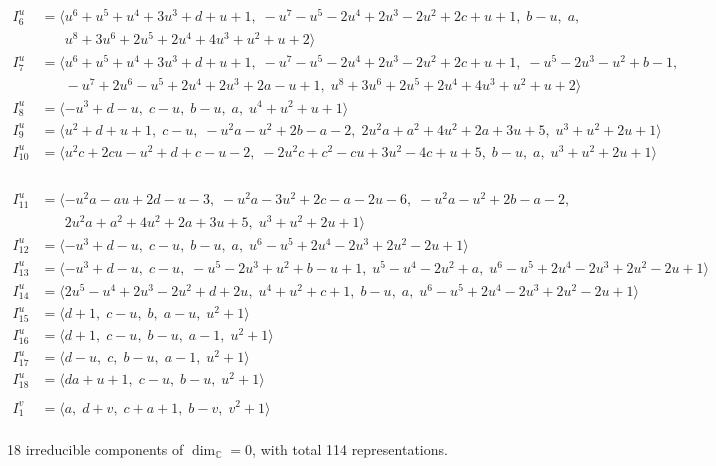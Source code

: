 \documentclass[1p]{elsarticle_modified}
\theoremstyle{definition}
\begin{document}
\begin{align*}
I^u_{6}&=\langle 
u^6+u^5+u^4+3 u^3+d+u+1,\;- u^7- u^5-2 u^4+2 u^3-2 u^2+2 c+u+1,\;b- u,\;a,\\
\phantom{I^u_{6}}&\phantom{= \langle  }u^8+3 u^6+2 u^5+2 u^4+4 u^3+u^2+u+2\rangle \\
I^u_{7}&=\langle 
u^6+u^5+u^4+3 u^3+d+u+1,\;- u^7- u^5-2 u^4+2 u^3-2 u^2+2 c+u+1,\;- u^5-2 u^3- u^2+b-1,\\
\phantom{I^u_{7}}&\phantom{= \langle  }- u^7+2 u^6- u^5+2 u^4+2 u^3+2 a- u+1,\;u^8+3 u^6+2 u^5+2 u^4+4 u^3+u^2+u+2\rangle \\
I^u_{8}&=\langle 
- u^3+d- u,\;c- u,\;b- u,\;a,\;u^4+u^2+u+1\rangle \\
I^u_{9}&=\langle 
u^2+d+u+1,\;c- u,\;- u^2 a- u^2+2 b- a-2,\;2 u^2 a+a^2+4 u^2+2 a+3 u+5,\;u^3+u^2+2 u+1\rangle \\
I^u_{10}&=\langle 
u^2 c+2 c u- u^2+d+c- u-2,\;-2 u^2 c+c^2- c u+3 u^2-4 c+u+5,\;b- u,\;a,\;u^3+u^2+2 u+1\rangle \\
\end{align*}\\
\begin{align*}
I^u_{11}&=\langle 
- u^2 a- a u+2 d- u-3,\;- u^2 a-3 u^2+2 c- a-2 u-6,\;- u^2 a- u^2+2 b- a-2,\\
\phantom{I^u_{11}}&\phantom{= \langle  }2 u^2 a+a^2+4 u^2+2 a+3 u+5,\;u^3+u^2+2 u+1\rangle \\
I^u_{12}&=\langle 
- u^3+d- u,\;c- u,\;b- u,\;a,\;u^6- u^5+2 u^4-2 u^3+2 u^2-2 u+1\rangle \\
I^u_{13}&=\langle 
- u^3+d- u,\;c- u,\;- u^5-2 u^3+u^2+b- u+1,\;u^5- u^4-2 u^2+a,\;u^6- u^5+2 u^4-2 u^3+2 u^2-2 u+1\rangle \\
I^u_{14}&=\langle 
2 u^5- u^4+2 u^3-2 u^2+d+2 u,\;u^4+u^2+c+1,\;b- u,\;a,\;u^6- u^5+2 u^4-2 u^3+2 u^2-2 u+1\rangle \\
I^u_{15}&=\langle 
d+1,\;c- u,\;b,\;a- u,\;u^2+1\rangle \\
I^u_{16}&=\langle 
d+1,\;c- u,\;b- u,\;a-1,\;u^2+1\rangle \\
I^u_{17}&=\langle 
d- u,\;c,\;b- u,\;a-1,\;u^2+1\rangle \\
I^u_{18}&=\langle 
d a+u+1,\;c- u,\;b- u,\;u^2+1\rangle \\
\\
I^v_{1}&=\langle 
a,\;d+v,\;c+a+1,\;b- v,\;v^2+1\rangle \\
\end{align*}
\raggedright * 18 irreducible components of $\dim_{\mathbb{C}}=0$, with total 114 representations.\\
\end{document}
